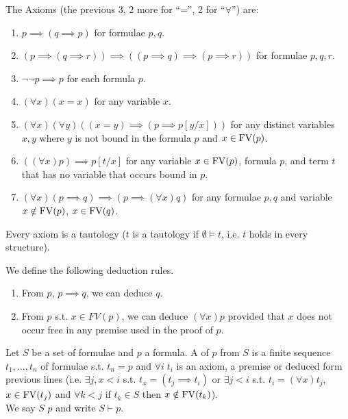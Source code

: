 The Axioms (the previous 3, 2 more for ``='', 2 for ``$\forall$'') are:
\begin{enumerate}
    \item $p \implies (q \implies p)$ for formulae $p, q$.
    \item $(p \implies (q \implies r)) \implies ((p \implies q) \implies (p \implies r))$ for formulae $p, q, r$.
    \item $\neg\neg p \implies p$ for each formula $p$.
    \item $(\forall x)(x = x)$ for any variable $x$.
    \item $(\forall x)(\forall y)((x = y) \implies (p \implies p[y/x]))$ for any distinct variables $x, y$ where $y$ is not bound in the formula $p$ and $x \in \operatorname{FV}(p)$.
    \item $((\forall x)p) \implies p[t/x]$ for any variable $x \in \operatorname{FV}(p)$, formula $p$, and term $t$ that has no variable that occurs bound in $p$.
    \item $(\forall x)(p \implies q) \implies (p \implies (\forall x)q)$ for any formulae $p, q$ and variable $x \notin \operatorname{FV}(p)$, $x \in \operatorname{FV}(q)$.
\end{enumerate}

\begin{note}
    Every axiom is a tautology ($t$ is a tautology if $\emptyset \models t$, i.e. $t$ holds in every structure).
\end{note}

We define the following deduction rules.
\begin{enumerate}
    \item {} From $p$, $p \implies q$, we can deduce $q$.
    \item {} From $p$ s.t. $x \in FV(p)$, we can deduce $(\forall x)p$ provided that $x$ does not occur free in any premise used in the proof of $p$.
\end{enumerate}

\begin{definition}[Proof]
    Let $S$ be a set of formulae and $p$ a formula.
    A  of $p$ from $S$ is a finite sequence $t_1, \dots, t_n$ of formulae s.t. $t_n = p$ and $\forall i \; t_i$ is an axiom, a premise or deduced form previous lines (i.e. $\exists j, x < i$ s.t. $t_x = (t_j \implies t_i)$ or $\exists j < i$ s.t. $t_i = (\forall x)t_j$, $x \in \operatorname{FV}(t_j)$ and $\forall k < j$ if $t_k \in S$ then $x \notin \operatorname{FV}(t_k)$). \\
    We say $S$  $p$ and write $S \vdash p$.
\end{definition}

